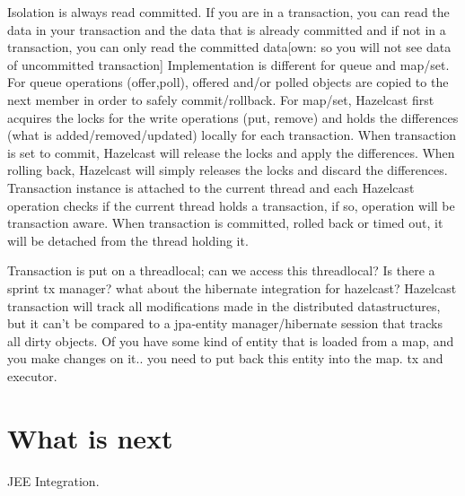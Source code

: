 Isolation is always read committed. If you are in a transaction, you can read the data in your transaction and the data that is already committed and if not in a transaction, you can only read the committed data[own: so you will not see data of uncommitted transaction] Implementation is different for queue and map/set. For queue operations (offer,poll), offered and/or polled objects are copied to the next member in order to safely commit/rollback. For map/set, Hazelcast first acquires the locks for the write operations (put, remove) and holds the differences (what is added/removed/updated) locally for each transaction. When transaction is set to commit, Hazelcast will release the locks and apply the differences. When rolling back, Hazelcast will simply releases the locks and discard the differences. Transaction instance is attached to the current thread and each Hazelcast operation checks if the current thread holds a transaction, if so, operation will be transaction aware. When transaction is committed, rolled back or timed out, it will be detached from the thread holding it.

Transaction is put on a threadlocal; can we access this threadlocal?
Is there a sprint tx manager?
what about the hibernate integration for hazelcast?
Hazelcast transaction will track all modifications made in the distributed datastructures, but it can't be compared to a jpa-entity manager/hibernate session that tracks all dirty objects. Of you have some kind of entity that is loaded from a map, and you make changes on it.. you need to put back this entity into the map. 
tx and executor.

\section{What is next}
JEE Integration.